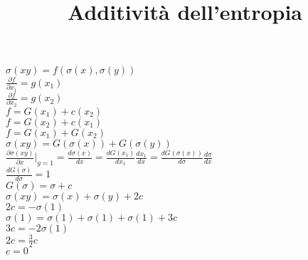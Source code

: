 \documentclass{amsart}
\title{Additività dell'entropia}
\newcommand{\pd}[2]{\frac{\partial #1}{\partial #2}}
\begin{document}
\maketitle
    $\sigma(xy)=f(\sigma(x),\sigma(y))$\\
    $\pd{f}{x_1}=g(x_1)$\\
    $\pd{f}{x_2}=g(x_2)$\\
    $f=G(x_1)+c(x_2)$\\
    $f=G(x_2)+c(x_1)$\\
    $f=G(x_1)+G(x_2)$\\
    $\sigma(xy)=G(\sigma(x))+G(\sigma(y))$\\
    $\pd{\sigma(xy)}{x}|_{y=1}=\frac{d\sigma(x)}{dx}=\frac{dG(x_1)}{dx_1}\frac{dx_1}{dx}
        =\frac{dG(\sigma(x))}{d\sigma}\frac{d\sigma}{dx}$\\
    $\frac{dG(\sigma)}{d\sigma}=1$\\
    $G(\sigma)=\sigma+c$\\
    $\sigma(xy)=\sigma(x)+\sigma(y)+2c$\\
    $2c=-\sigma(1)$\\
    $\sigma(1)=\sigma(1)+\sigma(1)+\sigma(1)+3c$\\
    $3c=-2\sigma(1)$\\
    $2c=\frac{3}{2}c$\\
    $c=0$\\
    
\end{document}
